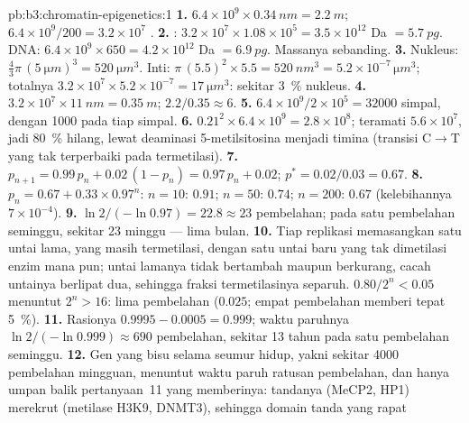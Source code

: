 \begin{solution}{pb:b3:chromatin-epigenetics:1}
\textbf{1.} $6.4\times 10^{9}\times \qty{0.34}{nm} = \qty{2.2}{m}$;
$6.4\times 10^{9}/200 = 3.2\times 10^{7}$ .
\textbf{2.} : $3.2\times 10^{7}\times 1.08\times 10^{5} =
3.5\times 10^{12}$ Da $= \qty{5.7}{pg}$. DNA: $6.4\times 10^{9}\times
650 = 4.2\times 10^{12}$ Da $= \qty{6.9}{pg}$. Massanya sebanding.
\textbf{3.} Nukleus: $\tfrac{4}{3}\pi\,(\qty{5}{\micro m})^{3} =
\qty{520}{\micro m^3}$. Inti: $\pi\,(5.5)^{2}\times 5.5 =
\qty{520}{nm^3} = 5.2\times 10^{-7}\,\unit{\micro m^3}$; totalnya
$3.2\times 10^{7}\times 5.2\times 10^{-7} = \qty{17}{\micro m^3}$:
sekitar \qty{3}{\%} nukleus.
\textbf{4.} $3.2\times 10^{7}\times \qty{11}{nm} = \qty{0.35}{m}$;
 $2.2/0.35 \approx 6$.
\textbf{5.} $6.4\times 10^{9}/2\times 10^{5} = \num{32000}$ simpal, dengan
\num{1000}  pada tiap simpal.
\textbf{6.} $0.21^{2}\times 6.4\times 10^{9} = 2.8\times 10^{8}$;
teramati $5.6\times 10^{7}$, jadi \qty{80}{\%} hilang, lewat deaminasi
5-metilsitosina menjadi timina (transisi C$\to$T yang tak terperbaiki pada
 termetilasi).
\textbf{7.} $p_{n+1} = 0.99\,p_{n} + 0.02\,(1 - p_{n}) = 0.97\,p_{n} +
0.02$; $p^{*} = 0.02/0.03 = 0.67$.
\textbf{8.} $p_{n} = 0.67 + 0.33\times 0.97^{n}$: $n = 10$: $0.91$;
$n = 50$: $0.74$; $n = 200$: $0.67$ (kelebihannya $7\times 10^{-4}$).
\textbf{9.} $\ln 2/(-\ln 0.97) = 22.8 \approx 23$ pembelahan; pada satu
pembelahan seminggu, sekitar \num{23} minggu --- lima bulan.
\textbf{10.} Tiap replikasi memasangkan satu untai lama, yang masih
termetilasi, dengan satu untai baru yang tak dimetilasi enzim mana pun;
untai lamanya tidak bertambah maupun berkurang, cacah untainya berlipat dua,
sehingga fraksi termetilasinya separuh. $0.80/2^{n} < 0.05$ menuntut
$2^{n} > 16$: lima pembelahan ($0.025$; empat pembelahan memberi tepat
\qty{5}{\%}).
\textbf{11.} Rasionya $0.9995 - 0.0005 = 0.999$; waktu paruhnya $\ln
2/(-\ln 0.999) \approx 690$ pembelahan, sekitar \num{13} tahun pada satu
pembelahan seminggu.
\textbf{12.} Gen yang bisu selama seumur hidup, yakni sekitar \num{4000}
pembelahan mingguan, menuntut waktu paruh ratusan pembelahan, dan hanya
umpan balik pertanyaan~11 yang memberinya:  tandanya (MeCP2, HP1)
merekrut  (metilase H3K9, DNMT3), sehingga domain tanda yang rapat

\end{solution}
